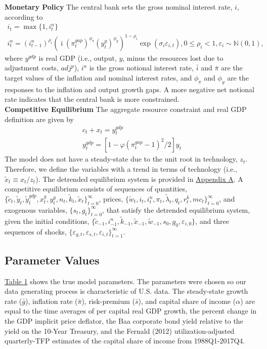 \documentclass[12pt, final]{article}
\begin{document}
\noindent
\textbf{Monetary Policy} The central bank sets the gross nominal interest rate, $i$, according to
\begin{gather}
    \label{eq:15}
    i_t=\max\{1,i_t^n\}\\
      \label{eq:16}
  i_t^n=(i^n_{t-1})^{\rho_i}(\bar{\imath}(\pi^{gap}_t)^{\phi_\pi}(y^{g}_{t})^{\phi_y})^{1-\rho_i}\exp(\sigma_i\varepsilon_{i,t}), 0 \leq \rho_i < 1, \varepsilon_i \sim \mathds{N}(0,1),
  \end{gather}
where $y^{gdp}$ is real GDP (i.e., output, $y$, minus the resources lost due to adjustment costs, $adj^p$), $i^n$ is the gross notional interest rate, $\bar i$ and $\bar{\pi}$ are the target values of the inflation and nominal interest rates, and $\phi_\pi$ and $\phi_y$ are the responses to the inflation and output growth gaps. A more negative net notional rate indicates that the central bank is more constrained.\\

\noindent
\textbf{Competitive Equilibrium} The aggregate resource constraint and real GDP definition are given by
\begin{gather}
  c_t + x_t = y_t^{gdp}\\
  y_t^{gdp} = [1 - \varphi(\pi_t^{gap}-1)^2/2]y_t
\end{gather}
The model does not have a steady-state due to the unit root in technology, $z_t$. Therefore, we define the variables with a trend in terms of technology (i.e., $\tilde{x}_t \equiv x_t/z_t$). The detrended equilibrium system is provided in \hyperlink{Appendix A}{Appendix A}. A competitive equilibrium consists of sequences of quantities, $\{\tilde{c}_t, \tilde{y}_t, \tilde{y}_t^{gdp}, x^g_t, y^g_t, n_t, \tilde{k}_t, \tilde{x}_t\}_{t=0}^\infty$, prices, $\{\tilde{w}_t, i_t, i^n_t, \pi_t, \tilde{\lambda}_t, q_t, r^k_t, mc_t\}_{t=0}^\infty$, and exogenous variables, $\{s_t,g_t\}_{t=0}^\infty$, that satisfy the detrended equilibrium system, given the initial conditions, $\{\tilde{c}_{-1}, i^n_{-1}, \tilde{k}_{-1}, \tilde{x}_{-1}, \tilde{w}_{-1}, s_0, g_0, \varepsilon_{i,0}\}$, and three sequences of shocks, $\{\varepsilon_{g,t}, \varepsilon_{s,t}, \varepsilon_{i,t}\}_{t=1}^\infty$.

\subsection{Parameter Values} \hyperlink{Table 1}{Table 1} shows the true model parameters. The parameters were chosen so our data generating process is characteristic of U.S. data. The steady-state growth rate ($\bar{g}$), inflation rate ($\bar{\pi}$), risk-premium ($\bar{s}$), and capital share of income ($\alpha$) are equal to the time averages of per capital real GDP growth, the percent change in the GDP implicit price deflator, the Baa corporate bond yield relative to the yield on the 10-Year Treasury, and the Fernald (2012) utilization-adjusted quarterly-TFP estimates of the capital share of income from 1988Q1-2017Q4.
\end{document}
